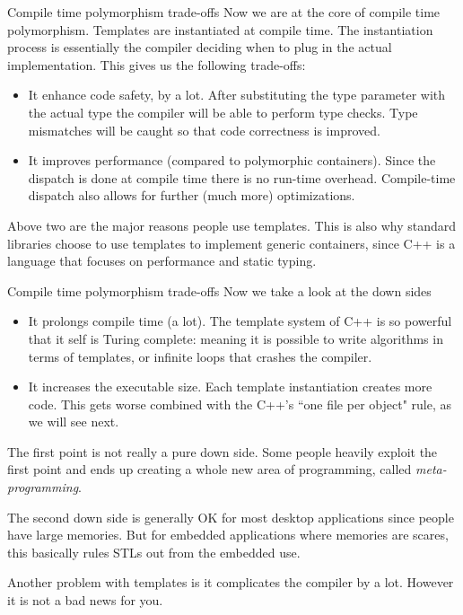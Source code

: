 \begin{frame}{Compile time polymorphism trade-offs}
\small
Now we are at the core of compile time polymorphism. Templates are instantiated at compile time. The instantiation process is essentially the compiler deciding when to plug in the actual implementation. This gives us the following trade-offs:
\begin{itemize}
	\item It enhance code safety, by a lot. After substituting the type parameter with the actual type the compiler will be able to perform type checks. Type mismatches will be caught so that code correctness is improved.
	\item It improves performance (compared to polymorphic containers). Since the dispatch is done at compile time there is no run-time overhead. Compile-time dispatch also allows for further (much more) optimizations.
\end{itemize}

Above two are the major reasons people use templates. This is also why standard libraries choose to use templates to implement generic containers, since C++ is a language that focuses on performance and static typing. 
\end{frame}

\begin{frame}{Compile time polymorphism trade-offs}
\small
Now we take a look at the down sides
\begin{itemize}
	\item It prolongs compile time (a lot). The template system of C++ is so powerful that it self is Turing complete: meaning it is possible to write algorithms in terms of templates, or infinite loops that crashes the compiler.
	\item It increases the executable size. Each template instantiation creates more code. This gets worse combined with the C++'s ``one file per object" rule, as we will see next.
\end{itemize}

The first point is not really a pure down side. Some people heavily exploit the first point and ends up creating a whole new area of programming, called \textit{meta-programming}. 

The second down side is generally OK for most desktop applications since people have large memories. But for embedded applications where memories are scares, this basically rules STLs out from the embedded use. 

Another problem with templates is it complicates the compiler by a lot. However it is not a bad news for you.
\end{frame}

